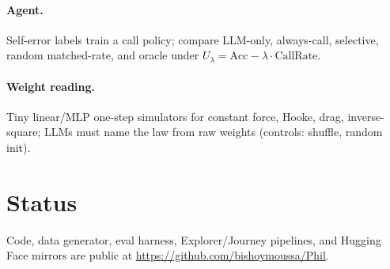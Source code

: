 \documentclass{article}
\begin{document}
\paragraph{Agent.} Self-error labels train a call policy; compare LLM-only, always-call, selective, random matched-rate, and oracle under $U_\lambda=\mathrm{Acc}-\lambda\cdot\mathrm{CallRate}$.

\paragraph{Weight reading.} Tiny linear/MLP one-step simulators for constant force, Hooke, drag, inverse-square; LLMs must name the law from raw weights (controls: shuffle, random init).

\section{Status}
Code, data generator, eval harness, Explorer/Journey pipelines, and Hugging Face mirrors are public at \url{https://github.com/bishoymoussa/Phil}.
\end{document}
